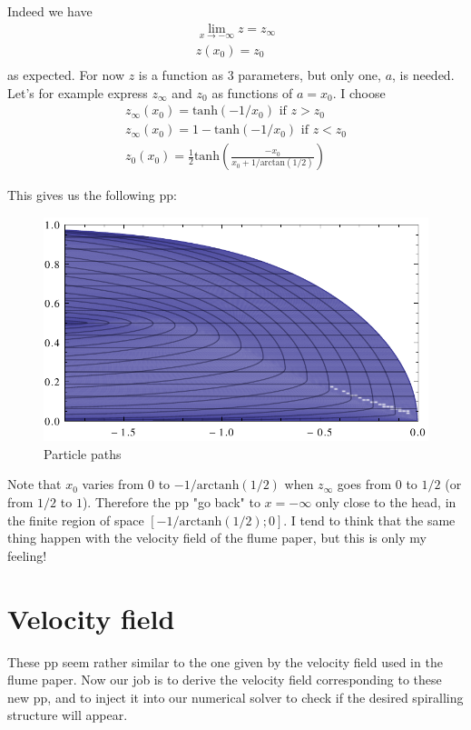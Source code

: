 \documentclass[11pt]{article}
\begin{document}
Indeed we have 
\[
\begin{matrix}
	\lim_{x \rightarrow -\infty} z = z_\infty \\
	z(x_0) = z_0 \\
\end{matrix}
\]
as expected. For now $z$ is a function as 3 parameters, but only one, $a$, is needed.
Let's for example express $z_\infty$ and $z_0$ as functions of $a = x_0$. I choose
\[
\begin{matrix}
   z_\infty(x_0) = \text{tanh}(-1/x_0) \text{ if } z > z_0 \\
   z_\infty(x_0) = 1 - \text{tanh}(-1/x_0) \text{ if } z < z_0 \\
   z_0(x_0) = \frac{1}{2} \text{tanh}\left(\frac{-x_0}{x_0+1/\text{arctan}(1/2)}\right) 
\end{matrix}
\]

This gives us the following pp:

\begin{figure}[htp]
\centering
\includegraphics[scale=0.9]{remap_particle_paths.pdf}
\caption{Particle paths}
\label{}
\end{figure}

Note that $x_0$ varies from $0$ to $-1/\text{arctanh}(1/2)$ when $z_\infty$ goes from $0$ to $1/2$ (or from $1/2$ to $1$).
Therefore the pp "go back" to $x = -\infty$ only close to the head, in the finite region of space $[-1/\text{arctanh}(1/2);0]$.
I tend to think that the same thing happen with the velocity field of the flume paper, but this is only my feeling!

\section{Velocity field}

These pp seem rather similar to the one given by the velocity field used in the flume paper.
Now our job is to derive the velocity field corresponding to these new pp, and to inject it into our numerical solver to check if the desired spiralling structure will appear.
\end{document}
